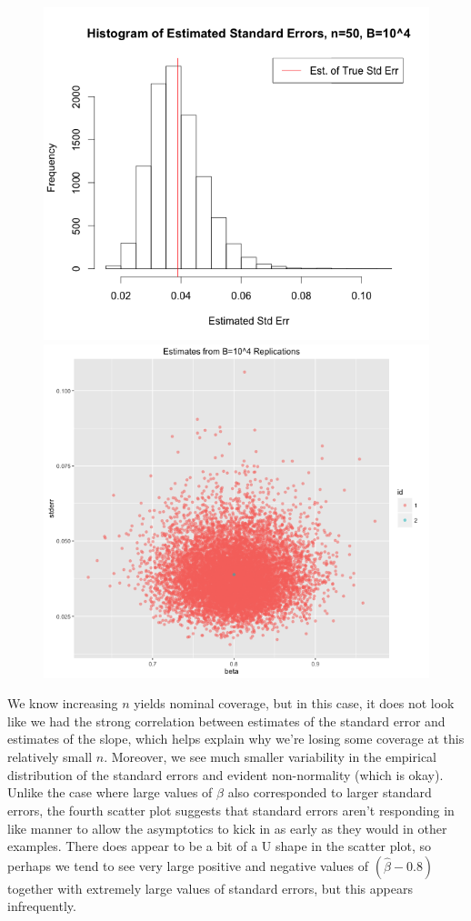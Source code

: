 \documentclass[11pt]{article}
\begin{document}
\begin{enumerate}
		\begin{figure}[H]
			\includegraphics[scale=0.4]{Rplotp23}
			\includegraphics[scale=0.4]{Rplotp24}	
		\end{figure}
		We know increasing $n$ yields nominal coverage, but in this case, it does not look like we had the strong correlation between estimates of the standard error and estimates of the slope, which helps explain why we're losing some coverage at this relatively small $n$. Moreover, we see much smaller variability in the empirical distribution of the standard errors and evident non-normality (which is okay). Unlike the case where large values of $\widehat\beta$ also corresponded to larger standard errors, the fourth scatter plot suggests that standard errors aren't responding in like manner to allow the asymptotics to kick in as early as they would in other examples. There does appear to be a bit of a U shape in the scatter plot, so perhaps we tend to see very large positive and negative values of $(\widehat\beta - 0.8)$ together with extremely large values of standard errors, but this appears infrequently.

\end{enumerate}
\end{document}
